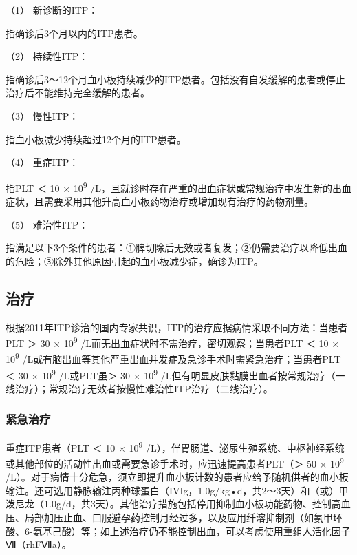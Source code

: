 \hypertarget{text00331.htmlux5cux23CHP12-1-1-2-3-3-1}{}
（1） 新诊断的ITP：

指确诊后3个月以内的ITP患者。

\hypertarget{text00331.htmlux5cux23CHP12-1-1-2-3-3-2}{}
（2） 持续性ITP：

指确诊后3～12个月血小板持续减少的ITP患者。包括没有自发缓解的患者或停止治疗后不能维持完全缓解的患者。

\hypertarget{text00331.htmlux5cux23CHP12-1-1-2-3-3-3}{}
（3） 慢性ITP：

指血小板减少持续超过12个月的ITP患者。

\hypertarget{text00331.htmlux5cux23CHP12-1-1-2-3-3-4}{}
（4） 重症ITP：

指PLT ＜ 10 × 10\textsuperscript{9}
/L，且就诊时存在严重的出血症状或常规治疗中发生新的出血症状，且需要采用其他升高血小板药物治疗或增加现有治疗的药物剂量。

\hypertarget{text00331.htmlux5cux23CHP12-1-1-2-3-3-5}{}
（5） 难治性ITP：

指满足以下3个条件的患者：①脾切除后无效或者复发；②仍需要治疗以降低出血的危险；③除外其他原因引起的血小板减少症，确诊为ITP。

\subsection{治疗}

根据2011年ITP诊治的国内专家共识，ITP的治疗应据病情采取不同方法：当患者PLT
＞ 30 × 10\textsuperscript{9}
/L而无出血症状时不需治疗，密切观察；当患者PLT ＜ 10 ×
10\textsuperscript{9}
/L或有脑出血等其他严重出血并发症及急诊手术时需紧急治疗；当患者PLT ＜ 30
× 10\textsuperscript{9} /L或PLT虽＞ 30 × 10\textsuperscript{9}
/L但有明显皮肤黏膜出血者按常规治疗（一线治疗）；常规治疗无效者按慢性难治性ITP治疗（二线治疗）。

\subsubsection{紧急治疗}

重症ITP患者（PLT ＜ 10 × 10\textsuperscript{9}
/L），伴胃肠道、泌尿生殖系统、中枢神经系统或其他部位的活动性出血或需要急诊手术时，应迅速提高患者PLT（＞
50 × 10\textsuperscript{9}
/L）。对于病情十分危急，须立即提升血小板计数的患者应给予随机供者的血小板输注。还可选用静脉输注丙种球蛋白（IVIg，1.0g/kg•d，共2～3天）和（或）甲泼尼龙（1.0g/d，共3天）。其他治疗措施包括停用抑制血小板功能药物、控制高血压、局部加压止血、口服避孕药控制月经过多，以及应用纤溶抑制剂（如氨甲环酸、6-氨基己酸）等；如上述治疗仍不能控制出血，可以考虑使用重组人活化因子Ⅶ（rhFⅦa）。

